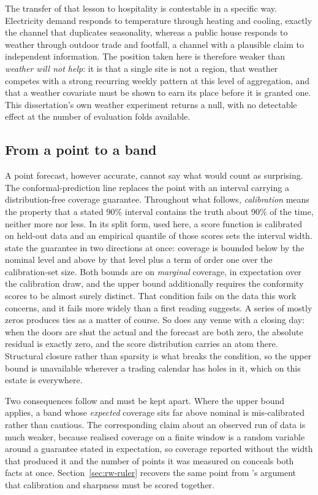 The transfer of that lesson to hospitality is contestable in a specific way.
Electricity demand responds to temperature through heating and cooling, exactly
the channel that duplicates seasonality, whereas a public house responds to
weather through outdoor trade and footfall, a channel with a plausible claim to
independent information. The position taken here is therefore weaker than
\emph{weather will not help}: it is that a single site is not a region, that
weather competes with a strong recurring weekly pattern at this level of
aggregation, and that a weather covariate must be shown to earn its place before
it is granted one. This dissertation's own weather experiment returns a null,
with no detectable effect at the number of evaluation folds available.

\subsection{From a point to a band}

A point forecast, however accurate, cannot say what would count as surprising.
The conformal-prediction line replaces the point with an interval carrying a
distribution-free coverage guarantee. Throughout what follows,
\emph{calibration} means the property that a stated 90\% interval contains the
truth about 90\% of the time, neither more nor less. In its split form, used
here, a score function is calibrated on held-out data and an empirical quantile
of those scores sets the interval width. \citet{angelopoulos_conformal_2023}
state the guarantee in two directions at once: coverage is bounded below by the
nominal level and above by that level plus a term of order one over the
calibration-set size. Both bounds are on \emph{marginal} coverage, in expectation
over the calibration draw, and the upper bound additionally requires the
conformity scores to be almost surely distinct. That condition fails on the data
this work concerns, and it fails more widely than a first reading suggests. A
series of mostly zeros produces ties as a matter of course. So does any venue
with a closing day: when the doors are shut the actual and the forecast are both
zero, the absolute residual is exactly zero, and the score distribution carries
an atom there. Structural closure rather than sparsity is what breaks the
condition, so the upper bound is unavailable wherever a trading calendar has
holes in it, which on this estate is everywhere.

Two consequences follow and must be kept apart. Where the upper bound applies, a
band whose \emph{expected} coverage sits far above nominal is mis-calibrated
rather than cautious. The corresponding claim about an observed run of data is
much weaker, because realised coverage on a finite window is a random variable
around a guarantee stated in expectation, so coverage reported without the width
that produced it and the number of points it was measured on conceals both facts
at once. Section~\ref{sec:rw-ruler} recovers the same point from
\citeauthor{kolassa_evaluating_2016}'s argument that calibration and sharpness
must be scored together.

